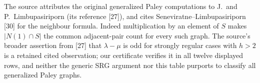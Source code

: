 The source attributes the original generalized Paley computations to
J.~and P.~Limbupasiriporn (its reference [27]), and cites
Seneviratne--Limbupasiriporn [30] for the neighbour formula.
Indeed multiplication by an element of $S$ makes
$|N(1)\cap S|$ the common adjacent-pair count for every such graph.
The source's broader assertion from [27] that $\lambda-\mu$ is odd for
strongly regular cases with $h>2$ is a retained cited observation; our
certificate verifies it in all twelve displayed rows, and neither the
generic SRG argument nor this table purports to classify all generalized
Paley graphs.
